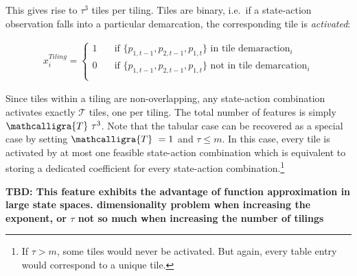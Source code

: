 This gives rise to $\tau^3$ tiles per tiling. Tiles are binary, i.e.\ if a state-action observation falls into a particular demarcation, the corresponding tile is \emph{activated}:

\begin{gather}\label{tile_activation}
x_i^{Tiling} = \begin{cases}
1 & \quad \text{if } \{p_{1, t-1}, p_{2, t-1}, p_{1, t}\} \text{~in tile demaraction}_i  \\
0 & \quad \text{if } \{p_{1, t-1}, p_{2, t-1}, p_{1, t}\} \text{~not in tile demarcation}_i \\ \end{cases} 
\end{gather}

Since tiles within a tiling are non-overlapping, any state-action combination activates exactly $\mathcal{T}$ tiles, one per tiling. The total number of features is simply $\mathcalligra{T}~\tau^3$. Note that the tabular case can be recovered as a special case by setting $\mathcalligra{T}~ = 1$ and $\tau \leq m$. In this case, every tile is activated by at most one feasible state-action combination which is equivalent to storing a dedicated coefficient for every state-action combination.\footnote{If $\tau > m$, some tiles would never be activated. But again, every table entry would correspond to a unique tile.}

\textbf{TBD: This feature exhibits the advantage of function approximation in large state spaces.  dimensionality problem when increasing the exponent, or $\tau$ not so much when increasing the number of tilings}
